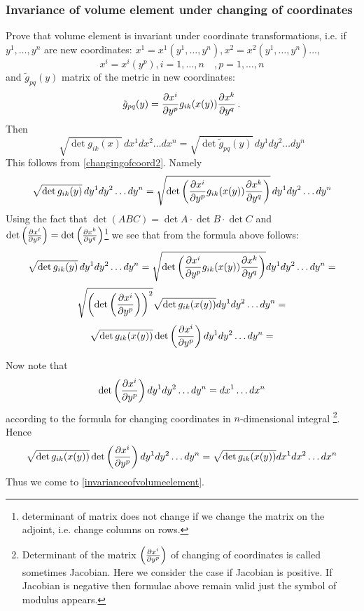 \documentclass[12pt]{article}
\theoremstyle{theorem}
\numberwithin{equation}{section}
\begin{document}
{\subsubsection{
Invariance of volume element under changing of coordinates }
\medskip

    Prove that volume element is invariant under coordinate transformations,
    i.e. if $y^1,\dots,y^n$ are new coordinates:
    $x^1=x^1(y^1,\dots,y^n), x^2=x^2(y^1,\dots,y^n)...$,
                      $$
          x^i=x^i(y^p), i=1,\dots,n\quad, p=1,\dots,n
                      $$
and   $\tilde g_{pq}(y)$ matrix of the metric in new coordinates:
                       \begin{equation}\label{changingofcoord2}
    \tilde g_{pq}(y)={\partial x^i\over \partial y^{p}}g_{ik}(x(y))
             {\partial x^k\over \partial y^{q}}\,.
\end{equation}
Then
                    \begin{equation}\label{invarianceofvolumeelement}
 \sqrt {\det g_{ik}(x)}\,dx^1 dx^2 \dots dx^n=
 \sqrt {\det \tilde g_{pq}(y)}\,dy^1 dy^2 \dots dy^n
\end{equation}
This follows from \eqref{changingofcoord2}. Namely
                             $$
\sqrt {\det g_{ik}(y)}\,dy^1 dy^2 \dots dy^n=
\sqrt {\det \left({\partial x^i\over \partial y^{p}}g_{ik}(x(y))
             {\partial x^k\over \partial y^{q}}\right)}\,dy^1 dy^2 \dots dy^n
                             $$
Using the fact that $\det (ABC)=\det A\cdot \det B\cdot \det C$
and  $\det \left({\partial x^i\over \partial y^{p}}\right)=
\det \left({\partial x^k\over \partial y^{q}}\right)$\footnote{determinant of matrix does not change
if we change the matrix on the adjoint, i.e. change columns on rows.} we see that
from the formula above follows:
           $$
           \sqrt {\det g_{ik}(y)}\,dy^1 dy^2 \dots dy^n=
\sqrt {\det \left({\partial x^i\over \partial y^{p}}g_{ik}(x(y))
             {\partial x^k\over \partial y^{q}}\right)}
          dy^1 dy^2 \dots dy^n=
           $$
           $$
\sqrt {\left(\det
        \left(
    {\partial x^i\over \partial y^{p}}
    \right)\right)^2}
     \sqrt {\det g_{ik}(x(y))}
     dy^1 dy^2 \dots dy^n=
           $$
\begin{equation}\label{transformofvolumeform4}
\sqrt {\det g_{ik}(x(y))}
         \det
        \left(
    {\partial x^i\over \partial y^{p}}
    \right)
    dy^1 dy^2 \dots dy^n=
\end{equation}


Now note that   $$
\det \left({\partial x^i\over \partial y^{p}}\right)dy^1 dy^2 \dots dy^n=dx^1\dots dx^n
                $$
according to the formula for changing coordinates in $n$-dimensional integral
\footnote{Determinant of the matrix $\left({\partial x^i\over \partial y^{p}}\right)$ of changing of coordinates
is called sometimes Jacobian. Here we consider the case if Jacobian is positive.
If Jacobian is negative then formulae above remain valid just the symbol of modulus appears.}.
Hence
\begin{equation}\label{transformofvolumeform5}
\sqrt {\det g_{ik}(x(y))}\det
      \left(
 {\partial x^i\over \partial y^{p}}
 \right) dy^1 dy^2 \dots dy^n=
\sqrt {\det g_{ik}(x(y))}dx^1 dx^2 \dots dx^n
\end{equation}
Thus we come to \eqref{invarianceofvolumeelement}.}
\end{document}
